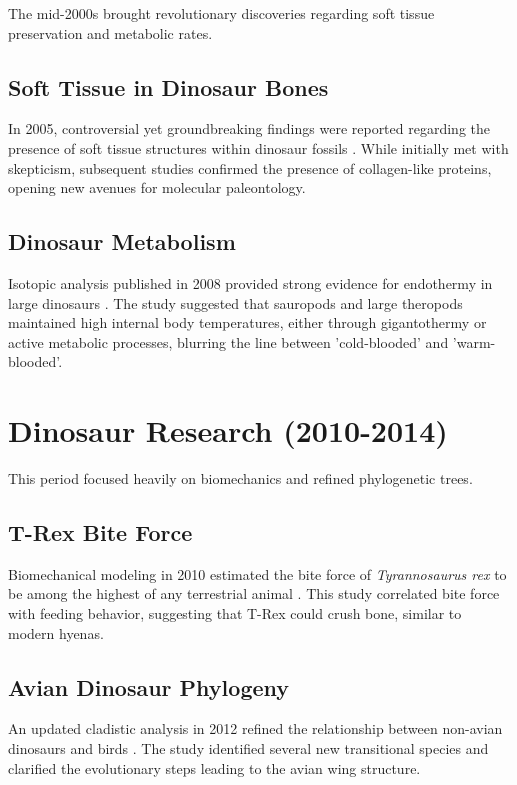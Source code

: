\documentclass[12pt, a4paper]{article}
\begin{document}
The mid-2000s brought revolutionary discoveries regarding soft tissue preservation and metabolic rates.

\subsection{Soft Tissue in Dinosaur Bones}
In 2005, controversial yet groundbreaking findings were reported regarding the presence of soft tissue structures within dinosaur fossils \cite{soft_tissue}. While initially met with skepticism, subsequent studies confirmed the presence of collagen-like proteins, opening new avenues for molecular paleontology.

\subsection{Dinosaur Metabolism}
Isotopic analysis published in 2008 provided strong evidence for endothermy in large dinosaurs \cite{dinosaur_metabolism}. The study suggested that sauropods and large theropods maintained high internal body temperatures, either through gigantothermy or active metabolic processes, blurring the line between 'cold-blooded' and 'warm-blooded'.

\section{Dinosaur Research (2010-2014)}

This period focused heavily on biomechanics and refined phylogenetic trees.

\subsection{T-Rex Bite Force}
Biomechanical modeling in 2010 estimated the bite force of \textit{Tyrannosaurus rex} to be among the highest of any terrestrial animal \cite{trex_bite}. This study correlated bite force with feeding behavior, suggesting that T-Rex could crush bone, similar to modern hyenas.

\subsection{Avian Dinosaur Phylogeny}
An updated cladistic analysis in 2012 refined the relationship between non-avian dinosaurs and birds \cite{avian_phylogeny}. The study identified several new transitional species and clarified the evolutionary steps leading to the avian wing structure.
\end{document}

